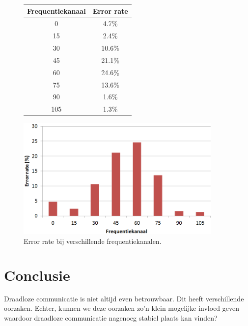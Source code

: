 \documentclass[a4paper,10pt]{article}
\begin{document}
\begin{figure}[h!]
    \begin{minipage}{\textwidth}
        \begin{minipage}{0.49\textwidth}
            \centering
            \begin{tabular}{cc} \hline
                Frequentiekanaal    &  Error rate   \\ \hline
                0                   &  4.7\%        \\
                15                  &  2.4\%        \\
                30                  &  10.6\%       \\
                45                  &  21.1\%       \\
                60                  &  24.6\%       \\
                75                  &  13.6\%       \\
                90                  &  1.6\%        \\
                105                 &  1.3\%        \\ \hline
            \end{tabular}
        \end{minipage}
        \hfill
        \begin{minipage}{0.49\textwidth}
            \centering
            \includegraphics[width=0.9\textwidth]{frequentiekanaal.png}
        \end{minipage}
        \caption{Error rate bij verschillende frequentiekanalen.}
        \label{fig:freqkanaal_table}
    \end{minipage}
\end{figure}

\section{Conclusie}
Draadloze communicatie is niet altijd even betrouwbaar. Dit heeft verschillende oorzaken. Echter, kunnen we deze oorzaken zo'n klein mogelijke invloed geven waardoor draadloze communicatie nagenoeg stabiel plaats kan vinden?
\end{document}
